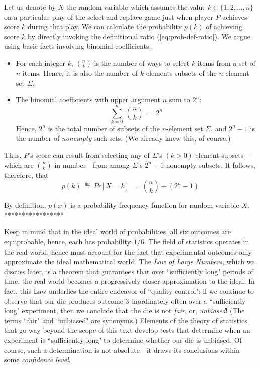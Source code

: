{Let us denote by $X$ the random variable which assumes the value 
$k \in \{1, 2, \ldots, n\}$ on a particular play of the {\sc select-and-replace} game 
just when player $P$ achieves score $k$ during that play.  We can calculate the
probability $p(k)$ of achieving score $k$ by directly invoking the
definitional ratio (\ref{eq:prob-def-ratio}).  We argue using basic facts involving 
binomial coefficients.
\begin{itemize}
\item
For each integer $k$, $\displaystyle {n \choose k}$ is the number of ways to 
select $k$ items from a set of $n$ items.
Hence, it is also the number of $k$-elements subsets of the $n$-element 
set $\Sigma$.
\item
The binomial coefficients with upper argument $n$ sum to $2^n$:
\[ \sum_{k=0}^n \ {n \choose k} \ = \ 2^n \]
Hence, $2^n$ is the total number of subsets of the $n$-element set $\Sigma$,
and $2^n -1$ is the number of {\em nonempty} such sets.
(We already knew this, of course.)
\end{itemize}
Thus, $P$'s score can result from selecting any of $\Sigma$'s $(k > 0)$-element 
subsets---which are $\displaystyle {n \choose k}$ in number---from among 
$\Sigma$'s $2^n -1$ nonempty subsets.  It follows, therefore, that
\[ p(k) \ \eqdef \ Pr[X = k] \ = \ {n \choose k} \div (2^n -1)  \]

By definition, $p(x)$ is a probability frequency function for random variable $X$.
*****************}

 


  
Keep in mind that in the ideal world of probabilities, all six outcomes are equiprobable, hence, 
each has probability $1/6$.  The field of statistics operates in the real world, hence must 
account for the fact that experimental outcomes only approximate the ideal mathematical world.  
The {\it Law of Large Numbers}, which we discuss later, is a theorem that guarantees that over 
``sufficiently long" periods of time, the real world becomes a progressively closer approximation 
to the ideal. In fact, this Law underlies the entire endeavor of ``quality control": if we continue to 
observe that our die produces outcome $3$ inordinately often over a ``sufficiently long" 
experiment, then we conclude that the die is not {\em fair}, or, {\em unbiased}!  (The terms
``fair" and ``unbiased" are synonyms.) Elements of the theory of statistics that go way beyond 
the scope of this text develop tests that determine when an experiment is ``sufficiently long" to 
determine whether our die is unbiased.  Of course, such a determination is not absolute---it
draws its conclusions within some {\em confidence level}.



